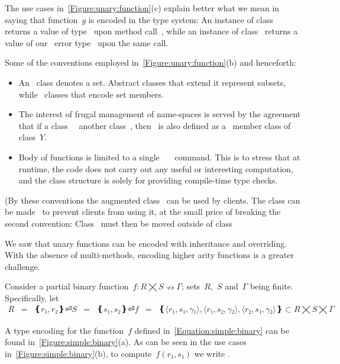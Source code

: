 The use cases in~\cref{Figure:unary:function}(c) explain better
  what we mean in saying that function~$g$ is encoded in the type system:
  An instance of class~ returns a value of type~ upon
  method call~, while
  an instance of class~ returns a value of our~
  error type~ upon the same call.

Some of the conventions employed in~\cref{Figure:unary:function}(b) and henceforth:
\begin{itemize}
  \item An~ class denotes a set. Abstract classes that extend it represent
      subsets, while~ classes that encode set members.
  \item The interest of frugal management of name-spaces is served by the agreement that if
    a class~~ another class~, then~ is also defined
    as a~ member class of class~$Y$.
  \item Body of functions is limited to a single~~~\cc{;} command.  
      This is to stress that at runtime, the code does not carry out any useful or interesting computation,
      and the class structure is solely for providing compile-time type checks.
\end{itemize}
(By these conventions the augmented class~ can be used by clients.
The class can be made~ to prevent clients from using it,
  at the small price of breaking the second convention:
  Class~ must then be moved outside of class~

We saw that unary functions can be encoded with inheritance and overriding.
With the absence of multi-methods, encoding higher arity functions is a greater challenge.

Consider a partial binary function~$f: R⨉S↛Γ$; sets~$R$,~$S$ and~$Γ$ being finite.
Specifically, let
\begin{equation}
  \label{Equation:simple:binary}
  \begin{array}{rcl}
    R & = & ❴ r₁, r₂❵⏎
    S & = & ❴ s₁, s₂❵⏎
    f & = & ❴ ⟨r₁, s₁,γ₁⟩, ⟨r₁, s₂,γ₂⟩, ⟨r₂, s₁,γ₂⟩ ❵ ⊂ R⨉S⨉Γ
  \end{array}
\end{equation}

A \Java type encoding for the function~$f$ defined in~\cref{Equation:simple:binary}
  can be found in~\cref{Figure:simple:binary}(a).
As can be seen in the use cases in~\cref{Figure:simple:binary}(b),
  to compute~$f(r₁,s₁)$ we write .

